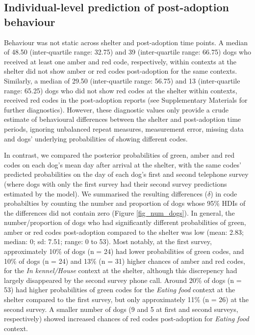 \documentclass[12pt]{article}
\begin{document}
\subsection{Individual-level prediction of post-adoption behaviour}
Behaviour was not static across shelter and post-adoption time points. A median of 48.50 (inter-quartile range: 32.75) and 39 (inter-quartile range: 66.75) dogs who received at least one amber and red code, respectively, within contexts at the shelter did not show amber or red codes post-adoption for the same contexts. Similarly, a median of 29.50 (inter-quartile range: 56.75) and 13 (inter-quartile range: 65.25) dogs who did not show red codes at the shelter within contexts, received red codes in the post-adoption reports (see Supplementary Materials for further diagnostics). However, these diagnostic values only provide a crude estimate of behavioural differences between the shelter and post-adoption time periods, ignoring unbalanced repeat measures, measurement error, missing data and dogs' underlying probabilities of showing different codes.

In contrast, we compared the posterior probabilities of green, amber and red codes on each dog's mean day after arrival at the shelter, with the same codes' predicted probabilities on the day of each dog's first and second telephone survey (where dogs with only the first survey had their second survey predictions estimated by the model). We summarised the resulting differences ($\delta$) in code probabilties by counting the number and proportion of dogs whose 95\% HDIs of the differences did not contain zero (Figure \ref{fig_num_dogs}). In general, the number/proportion of dogs who had significantly different probabilities of green, amber or red codes post-adoption compared to the shelter was low (mean: 2.83; median: 0; sd: 7.51; range: 0 to 53). Most notably, at the first survey, approximately 10\% of dogs (n = 24) had lower probabilities of green codes, and 10\% of dogs (n = 24) and 13\% (n = 31) higher chances of amber and red codes, for the \textit{In kennel/House} context at the shelter, although this discrepency had largely disappeared by the second survey phone call. Around 20\% of dogs (n = 53) had higher probabilities of green codes for the \textit{Eating food} context at the shelter compared to the first survey, but only approximately 11\% (n = 26) at the second survey. A smaller number of dogs (9 and 5 at first and second surveys, respectively) showed increased chances of red codes post-adoption for \textit{Eating food} context.
\end{document}
